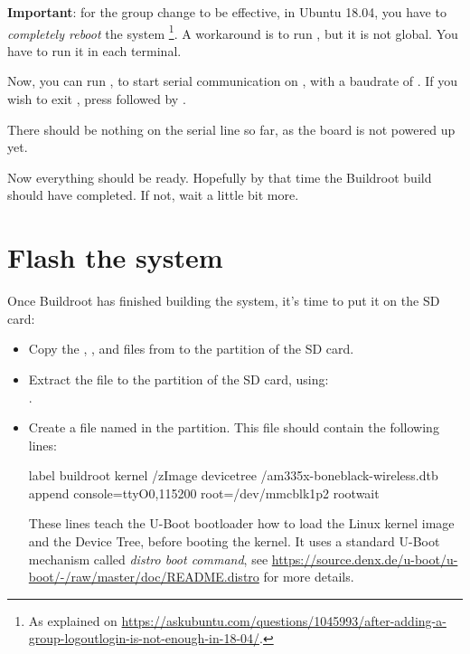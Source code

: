 
{\bf Important}: for the group change to be effective, in Ubuntu 18.04, you have to
{\em completely reboot} the system \footnote{As explained on
\url{https://askubuntu.com/questions/1045993/after-adding-a-group-logoutlogin-is-not-enough-in-18-04/}.}.
A workaround is to run , but it is not global.
You have to run it in each terminal.

Now, you can run , to start
serial communication on , with a baudrate of
. If you wish to exit , press
\code{[Ctrl][a]} followed by \code{[Ctrl][x]}.

There should be nothing on the serial line so far, as the board is not
powered up yet.



Now everything should be ready. Hopefully by that time the Buildroot
build should have completed. If not, wait a little bit more.

\section{Flash the system}

Once Buildroot has finished building the system, it's time to put it
on the SD card:

\begin{itemize}

\item Copy the , ,  and
   files from
   to the  partition of the SD card.

\item Extract the  file to the 
  partition of the SD card, using:\\
  .

\item Create a file named  in the
   partition. This file should contain the following lines:

{\small
\begin{fileinput}
label buildroot
  kernel /zImage
  devicetree /am335x-boneblack-wireless.dtb
  append console=ttyO0,115200 root=/dev/mmcblk1p2 rootwait
\end{fileinput}
}

These lines teach the U-Boot bootloader how to load the Linux kernel
image and the Device Tree, before booting the kernel. It uses a
standard U-Boot mechanism called {\em distro boot command}, see
\url{https://source.denx.de/u-boot/u-boot/-/raw/master/doc/README.distro}
for more details.

\end{itemize}

